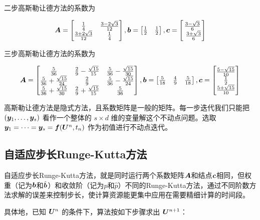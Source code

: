 \documentclass[lang=cn,a4paper,newtx,bibend=bibtex]{elegantpaper}
\begin{document}
二步高斯勒让德方法的系数为

\begin{equation*}
    \bm{A} = \begin{bmatrix} 
        \frac 14 & \frac{3-2\sqrt 3}{12} \\
        \frac {3+2\sqrt 3}{12} & \frac 14 \\
     \end{bmatrix},
    \bm{b} = \begin{bmatrix}  \frac 12 & \frac 12 \\ \end{bmatrix},
    \bm{c} = \begin{bmatrix}  \frac {3-\sqrt 3}6 \\\ \frac {3+\sqrt 3}6 \\ \end{bmatrix}
\end{equation*}

三步高斯勒让德方法的系数为

\begin{equation*}
    \bm{A} = \begin{bmatrix} 
        \frac 5{36} & \frac 29 - \frac{\sqrt{15}}{15} & \frac 5{36} - \frac{\sqrt{15}}{30} \\
        \frac{5}{36} + \frac{\sqrt{15}}{24} & \frac 29 & \frac 5{36} - \frac{\sqrt{15}}{24} \\
        \frac 5{36} + \frac{\sqrt{15}}{30} & \frac 29 + \frac{\sqrt{15}}{15} & \frac 5{36} \\
     \end{bmatrix},
    \bm{b} = \begin{bmatrix} \frac 5{18} & \frac 49 & \frac 5{18} \end{bmatrix},
    \bm{c} = \begin{bmatrix} \frac{5-\sqrt{15}}{10} \\ \frac 12 \\ \frac{5+\sqrt{15}}{10} \\ \end{bmatrix}
\end{equation*}

高斯勒让德方法是隐式方法，且系数矩阵是一般的矩阵。每一步迭代我们只能把 $(\bm{y}_1,\dots,\bm{y}_s)$ 看作一个整体的 $s\times d$ 维的变量解这个不动点问题。选取 $\bm{y}_1 = \dots = \bm{y}_s = \bm{f}(\bm{U}^n, t_n)$ 作为初值进行不动点迭代。

\subsection{自适应步长Runge-Kutta方法}

自适应步长Runge-Kutta方法，就是同时运行两个系数矩阵$\bm{A}$和结点$\bm{c}$相同，但权重（记为$\bm{b}$和$\hat{\bm{b}}$）和收敛阶（记为$p$和$\hat{p}$）不同的Runge-Kutta方法，通过不同阶数方法求解的误差来控制步长，使计算资源能更集中应用在需要精细计算的时间段。

具体地，已知 $\bm{U}^n$ 的条件下，算法按如下步骤求出 $\bm{U}^{n+1}$：
\end{document}

